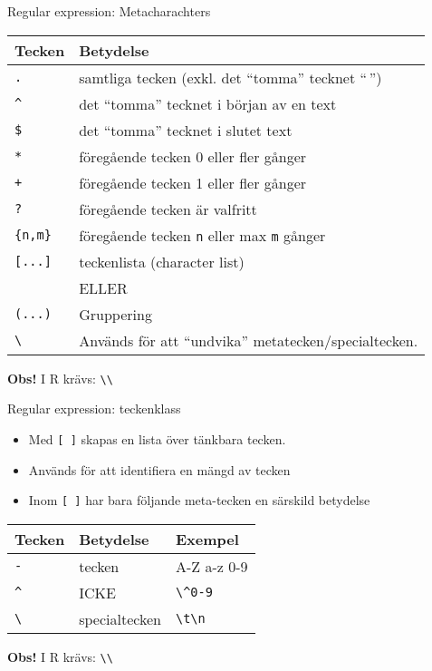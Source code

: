 \documentclass[
  11pt,
  ignorenonframetext,
  handout]{beamer}
\providecommand{\tightlist}{%
  \setlength{\itemsep}{0pt}\setlength{\parskip}{0pt}}
\begin{document}
\begin{frame}[fragile]{Regular expression: Metacharachters}
\protect\hypertarget{regular-expression-metacharachters}{}
\begin{longtable}[]{@{}ll@{}}
\toprule
Tecken & Betydelse \\
\midrule
\endhead
\texttt{.} & samtliga tecken (exkl. det ``tomma'' tecknet ``\,'') \\
\texttt{\^{}} & det ``tomma'' tecknet i början av en text \\
\texttt{\$} & det ``tomma'' tecknet i slutet text \\
\texttt{*} & föregående tecken 0 eller fler gånger \\
\texttt{+} & föregående tecken 1 eller fler gånger \\
\texttt{?} & föregående tecken är valfritt \\
\texttt{\{n,m\}} & föregående tecken \texttt{n} eller max \texttt{m}
gånger \\
\texttt{{[}...{]}} & teckenlista (character list) \\
\textbar{} & ELLER \\
\texttt{(...)} & Gruppering \\
\texttt{\textbackslash{}} & Används för att ``undvika''
metatecken/specialtecken. \\
\bottomrule
\end{longtable}

\textbf{Obs!} I R krävs: \texttt{\textbackslash{}\textbackslash{}}
\end{frame}


\begin{frame}[fragile]{Regular expression: teckenklass}
\protect\hypertarget{regular-expression-teckenklass}{}
\begin{itemize}
\tightlist
\item
  Med \texttt{{[}\ {]}} skapas en lista över tänkbara tecken.
\item
  Används för att identifiera en mängd av tecken
\item
  Inom \texttt{{[}\ {]}} har bara följande meta-tecken en särskild
  betydelse
\end{itemize}

\begin{longtable}[]{@{}lll@{}}
\toprule
Tecken & Betydelse & Exempel \\
\midrule
\endhead
\texttt{-} & tecken & A-Z a-z 0-9 \\
\texttt{\^{}} & ICKE & \texttt{\textbackslash{}\^{}0-9} \\
\texttt{\textbackslash{}} & specialtecken &
\texttt{\textbackslash{}t\textbackslash{}n} \\
\bottomrule
\end{longtable}

\textbf{Obs!} I R krävs: \texttt{\textbackslash{}\textbackslash{}}
\end{frame}
\end{document}
